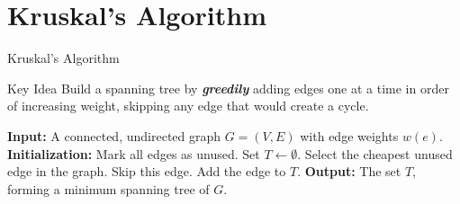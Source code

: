 \documentclass{beamer}
\begin{document}
\section{Kruskal's Algorithm}

\begin{frame}{Kruskal's Algorithm}
\begin{block}{Key Idea}
Build a spanning tree by \textbf{\emph{greedily}} adding edges one at a time in order of increasing weight, skipping any edge that would create a cycle.
\end{block}
\vspace{-0.2cm}
\begin{algorithm}[H]
\caption{Kruskal's Algorithm}
\begin{algorithmic}[1]
\State \textbf{Input:} A connected, undirected graph $G = (V, E)$ with edge weights $w(e)$.
\State \textbf{Initialization:} Mark all edges as unused. Set $T \gets \emptyset$.
\Repeat
  \State Select the cheapest unused edge in the graph.
    \State Skip this edge.
  \Else
    \State Add the edge to $T$.
  \EndIf
{}
\State \textbf{Output:} The set $T$, forming a minimum spanning tree of $G$.
\end{algorithmic}
\end{algorithm}
\end{frame}
\end{document}
